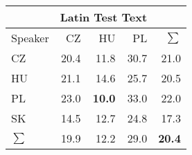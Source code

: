 \begin{tabular}{l|rrr|r}
\hline
& \multicolumn{3}{c}{Latin Test Text} & \\
\hline
 Speaker   &   CZ &   HU &   PL &   $\sum$ \\
\hline
CZ        & 20.4 & 11.8 & 30.7 &     21.0 \\
HU        & 21.1 & 14.6 & 25.7 &     20.5 \\
PL        & 23.0 & \bf{10.0} & 33.0 &     22.0 \\
SK        & 14.5 & 12.7 & 24.8 &     17.3 \\
\hline
$\sum$   & 19.9 & 12.2 & 29.0 &     \bf{20.4} \\
\hline
\end{tabular}
